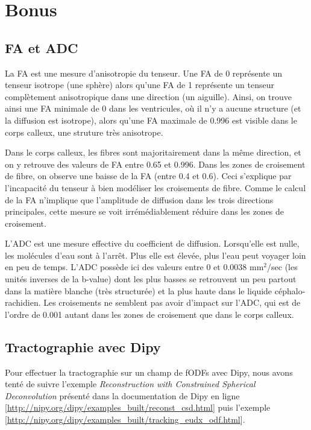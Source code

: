 \documentclass[a4paper]{article}
\begin{document}
\section{Bonus}

\subsection{FA et ADC}

La FA est une mesure d'anisotropie du tenseur. Une FA de 0 représente un tenseur isotrope (une sphère) alors qu'une FA de 1 représente un tenseur complètement anisotropique dans une direction (un aiguille). Ainsi, on trouve ainsi une FA minimale de 0 dans les ventricules, où il n'y a aucune structure (et la diffusion est isotrope), alors qu'une FA maximale de 0.996 est visible dans le corps calleux, une struture très anisotrope.

Dans le corps calleux, les fibres sont majoritairement dans la même direction, et on y retrouve des valeurs de FA entre 0.65 et 0.996. Dans les zones de croisement de fibre, on observe une baisse de la FA (entre 0.4 et 0.6). Ceci s'explique par l'incapacité du tenseur à bien modéliser les croisements de fibre. Comme le calcul de la FA n'implique que l'amplitude de diffusion dans les trois directions principales, cette mesure se voit irrémédiablement réduire dans les zones de croisement.

L'ADC est une mesure effective du coefficient de diffusion. Lorsqu'elle est nulle, les molécules d'eau sont à l'arrêt. Plus elle est élevée, plus l'eau peut voyager loin en peu de temps. L'ADC possède ici des valeurs entre 0 et 0.0038 mm$^2$/sec (les unités inverses de la b-value) dont les plus basses se retrouvent un peu partout dans la matière blanche (très structurée) et la plus haute dans le liquide céphalo-rachidien. Les croisements ne semblent pas avoir d'impact sur l'ADC, qui est de l'ordre de 0.001 autant dans les zones de croisement que dans le corps calleux.

\subsection{Tractographie avec Dipy}
Pour effectuer la tractographie sur un champ de fODFs avec Dipy, nous avons tenté de suivre l'exemple \textit{Reconstruction with Constrained Spherical Deconvolution} présenté dans la documentation de Dipy en ligne [\url{http://nipy.org/dipy/examples\_built/reconst\_csd.html}] puis l'exemple \textit{} [\url{http://nipy.org/dipy/examples_built/tracking_eudx_odf.html}].
\end{document}
